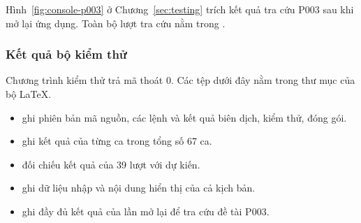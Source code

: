 Hình~\ref{fig:console-p003} ở Chương~\ref{sec:testing} trích kết quả tra cứu P003 sau khi mở lại ứng dụng. Toàn bộ lượt tra cứu nằm trong .
\subsubsection{Kết quả bộ kiểm thử}

Chương trình kiểm thử trả mã thoát 0. Các tệp dưới đây nằm trong thư mục  của bộ LaTeX.

\begin{itemize}
\setlength{\itemsep}{0pt}
\item {} ghi phiên bản mã nguồn, các lệnh và kết quả biên dịch, kiểm thử, đóng gói.
\item {} ghi kết quả của từng ca trong tổng số 67 ca.
\item {} đối chiếu kết quả của 39 lượt với dự kiến.
\item {} ghi dữ liệu nhập và nội dung hiển thị của cả kịch bản.
\item {} ghi đầy đủ kết quả của lần mở lại để tra cứu đề tài P003.
\end{itemize}
